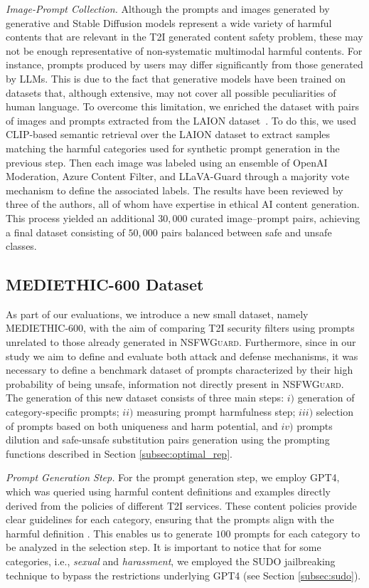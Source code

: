 \documentclass[acmsmall]{acmart}
\newcommand{\datacentok}{\textsc{NSFWGuard}\xspace}
\newcommand{\datasetlite}{\textsc{MEDIETHIC-600}\xspace}
\begin{document}
{\textit{Image-Prompt Collection.} 
Although the prompts and images generated by generative and Stable Diffusion models represent a wide variety of harmful contents that are relevant in the T2I generated content safety problem, these may not be enough representative of non-systematic multimodal harmful contents. For instance, prompts produced by users may differ significantly from those generated by LLMs. This is due to the fact that generative models have been trained on datasets that, although extensive, may not cover all possible peculiarities of human language.
To overcome this limitation, we enriched the dataset with pairs of images and prompts extracted from the LAION dataset~\cite{NEURIPS2022_a1859deb}. To do this, we used CLIP-based semantic retrieval over the LAION dataset to extract samples matching the harmful categories used for synthetic prompt generation in the previous step. Then each image was labeled using an ensemble of OpenAI Moderation, Azure Content Filter, and LLaVA-Guard through a majority vote mechanism to define the associated labels. The results have been reviewed by three of the authors, all of whom have expertise in ethical AI content generation. This process yielded an additional $30,000$ curated image–prompt pairs, achieving a final dataset consisting of $50,000$ pairs balanced between safe and unsafe classes. 
\vspace{-0.7em}
\subsection{\datasetlite Dataset}
As part of our evaluations, we introduce a new small dataset, namely \datasetlite, with the aim of comparing T2I security filters using prompts unrelated to those already generated in \datacentok. Furthermore, since in our study we aim to define and evaluate both attack and defense mechanisms, it was necessary to define a benchmark dataset of prompts characterized by their high probability of being unsafe, information not directly present in \datacentok.
The generation of this new dataset consists of three main steps: $i)$ generation of category-specific prompts; $ii)$ measuring prompt harmfulness step; $iii)$ selection of prompts based on both uniqueness and harm potential, and $iv)$ prompts dilution and safe-unsafe substitution pairs generation using the prompting functions described in Section \ref{subsec:optimal_rep}.

\textit{Prompt Generation Step.} For the prompt generation step, we employ GPT4, which was queried using harmful content definitions and examples directly derived from the policies of different T2I services. These content policies provide clear guidelines for each category, ensuring that the prompts align with the harmful definition \cite{dalle_content_policy,imagen_content_policy}. 
This enables us to generate $100$ prompts for each category to be analyzed in the selection step. It is important to notice that for some categories, i.e., \textit{sexual} and \textit{harassment}, we employed the SUDO jailbreaking technique to bypass the restrictions underlying GPT4 (see Section \ref{subsec:sudo}).  

}
\end{document}
